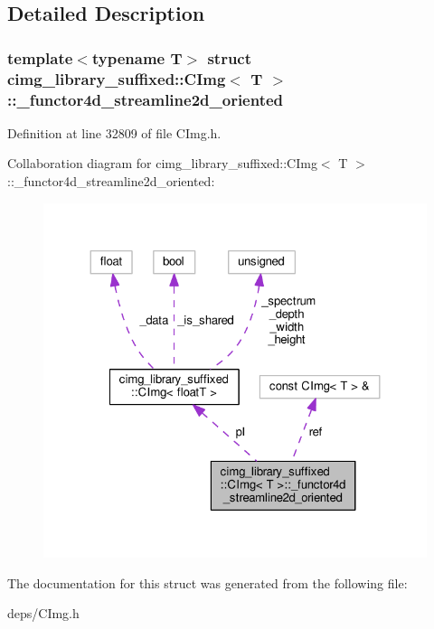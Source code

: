 \subsection{Detailed Description}
\subsubsection*{template$<$typename T$>$\newline
struct cimg\+\_\+library\+\_\+suffixed\+::\+C\+Img$<$ T $>$\+::\+\_\+functor4d\+\_\+streamline2d\+\_\+oriented}



Definition at line 32809 of file C\+Img.\+h.



Collaboration diagram for cimg\+\_\+library\+\_\+suffixed\+:\+:C\+Img$<$ T $>$\+:\+:\+\_\+functor4d\+\_\+streamline2d\+\_\+oriented\+:
\nopagebreak
\begin{figure}[H]
\begin{center}
\leavevmode
\includegraphics[width=324pt]{de/d10/structcimg__library__suffixed_1_1CImg_1_1__functor4d__streamline2d__oriented__coll__graph}
\end{center}
\end{figure}


The documentation for this struct was generated from the following file\+:\begin{DoxyCompactItemize}
\item 
deps/C\+Img.\+h\end{DoxyCompactItemize}
